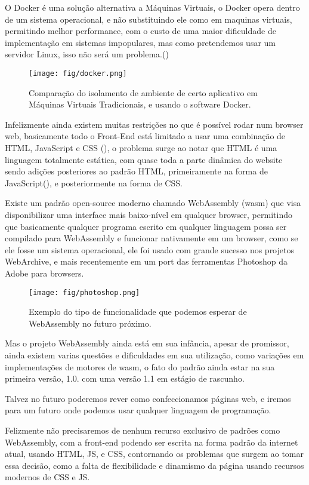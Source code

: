 O Docker é uma solução alternativa a Máquinas Virtuais, o Docker opera dentro de um sistema operacional, e não substituindo ele como em maquinas virtuais, permitindo melhor performance, com o custo de uma maior dificuldade de implementação em sistemas impopulares, mas como pretendemos usar um servidor Linux, isso não será um problema.(\citealt{docker_img_source})

\begin{figure}[!ht]
\begin{center}
\setcaptionmargin{1cm}
\texttt{[image: fig/docker.png]}
\caption[Comparação de Docker com Máquinas Virtuais.]{Comparação do isolamento de ambiente de certo aplicativo em Máquinas Virtuais Tradicionais, e usando o software Docker.} 
\label{docker_fig}
\end{center}
\end{figure}

Infelizmente ainda existem muitas restrições no que é possível rodar num browser web, basicamente todo o Front-End está limitado a usar uma combinação de HTML, JavaScript e CSS (\citealt{limitations_web_design}), o problema surge ao notar que HTML é uma linguagem totalmente estática, com quase toda a parte dinâmica do website sendo adições posteriores ao padrão HTML, primeiramente na forma de JavaScript(\citealt{limitations_web_design}), e posteriormente na forma de CSS.

Existe um padrão open-source moderno chamado WebAssembly (wasm) que visa disponibilizar uma interface mais baixo-nível em qualquer browser, permitindo que basicamente qualquer programa escrito em qualquer linguagem possa ser compilado para WebAssembly e funcionar nativamente em um browser, como se ele fosse um sistema operacional, ele foi usado com grande sucesso nos projetos WebArchive, e mais recentemente em um port das ferramentas Photoshop da Adobe para browsers.

\begin{figure}[!ht]
\begin{center}
\setcaptionmargin{1cm}
\texttt{[image: fig/photoshop.png]}
\caption[Exemplo do Photoshop usando WebAssembly.]{Exemplo do tipo de funcionalidade que podemos esperar de WebAssembly no futuro próximo.} 
\label{docker_fig}
\end{center}
\end{figure}

Mas o projeto WebAssembly ainda está em sua infância, apesar de promissor, ainda existem varias questões e dificuldades em sua utilização, como variações em implementações de motores de wasm, o fato do padrão ainda estar na sua primeira versão, 1.0. com uma versão 1.1 em estágio de rascunho.

Talvez no futuro poderemos rever como confeccionamos páginas web, e iremos para um futuro onde podemos usar qualquer linguagem de programação.

Felizmente não precisaremos de nenhum recurso exclusivo de padrões como WebAssembly, com a front-end podendo ser escrita na forma padrão da internet atual, usando HTML, JS, e CSS, contornando os problemas que surgem ao tomar essa decisão, como a falta de flexibilidade e dinamismo da página usando recursos modernos de CSS e JS.
